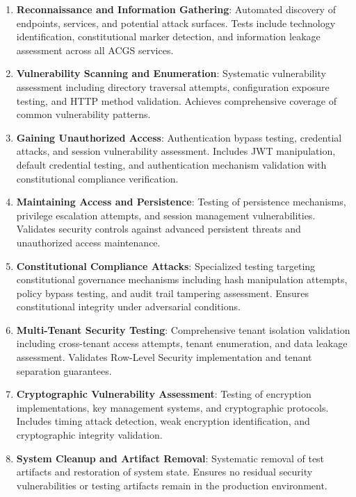 \documentclass[manuscript,screen,9pt]{acmart}
\begin{document}
\begin{enumerate}[leftmargin=*,itemsep=2pt,parsep=1pt]
	\item \textbf{Reconnaissance and Information Gathering}: Automated discovery of endpoints, services, and potential attack surfaces. Tests include technology identification, constitutional marker detection, and information leakage assessment across all ACGS services.

	\item \textbf{Vulnerability Scanning and Enumeration}: Systematic vulnerability assessment including directory traversal attempts, configuration exposure testing, and HTTP method validation. Achieves comprehensive coverage of common vulnerability patterns.

	\item \textbf{Gaining Unauthorized Access}: Authentication bypass testing, credential attacks, and session vulnerability assessment. Includes JWT manipulation, default credential testing, and authentication mechanism validation with constitutional compliance verification.

	\item \textbf{Maintaining Access and Persistence}: Testing of persistence mechanisms, privilege escalation attempts, and session management vulnerabilities. Validates security controls against advanced persistent threats and unauthorized access maintenance.

	\item \textbf{Constitutional Compliance Attacks}: Specialized testing targeting constitutional governance mechanisms including hash manipulation attempts, policy bypass testing, and audit trail tampering assessment. Ensures constitutional integrity under adversarial conditions.

	\item \textbf{Multi-Tenant Security Testing}: Comprehensive tenant isolation validation including cross-tenant access attempts, tenant enumeration, and data leakage assessment. Validates Row-Level Security implementation and tenant separation guarantees.

	\item \textbf{Cryptographic Vulnerability Assessment}: Testing of encryption implementations, key management systems, and cryptographic protocols. Includes timing attack detection, weak encryption identification, and cryptographic integrity validation.

	\item \textbf{System Cleanup and Artifact Removal}: Systematic removal of test artifacts and restoration of system state. Ensures no residual security vulnerabilities or testing artifacts remain in the production environment.
\end{enumerate}
\end{document}
